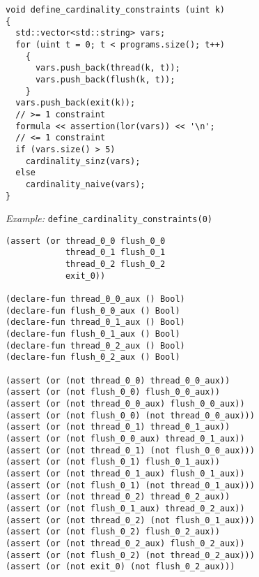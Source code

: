 \begin{lstlisting}[style=c++]
void define_cardinality_constraints (uint k)
{
  std::vector<std::string> vars;
  for (uint t = 0; t < programs.size(); t++)
    {
      vars.push_back(thread(k, t));
      vars.push_back(flush(k, t));
    }
  vars.push_back(exit(k));
  // >= 1 constraint
  formula << assertion(lor(vars)) << '\n';
  // <= 1 constraint
  if (vars.size() > 5)
    cardinality_sinz(vars);
  else
    cardinality_naive(vars);
}
\end{lstlisting}

\newpage

\noindent
\emph{Example:} \lstinline[style=c++]{define_cardinality_constraints(0)}

\begin{lstlisting}[language=SMTLib]
(assert (or thread_0_0 flush_0_0
            thread_0_1 flush_0_1
            thread_0_2 flush_0_2
            exit_0))

(declare-fun thread_0_0_aux () Bool)
(declare-fun flush_0_0_aux () Bool)
(declare-fun thread_0_1_aux () Bool)
(declare-fun flush_0_1_aux () Bool)
(declare-fun thread_0_2_aux () Bool)
(declare-fun flush_0_2_aux () Bool)

(assert (or (not thread_0_0) thread_0_0_aux))
(assert (or (not flush_0_0) flush_0_0_aux))
(assert (or (not thread_0_0_aux) flush_0_0_aux))
(assert (or (not flush_0_0) (not thread_0_0_aux)))
(assert (or (not thread_0_1) thread_0_1_aux))
(assert (or (not flush_0_0_aux) thread_0_1_aux))
(assert (or (not thread_0_1) (not flush_0_0_aux)))
(assert (or (not flush_0_1) flush_0_1_aux))
(assert (or (not thread_0_1_aux) flush_0_1_aux))
(assert (or (not flush_0_1) (not thread_0_1_aux)))
(assert (or (not thread_0_2) thread_0_2_aux))
(assert (or (not flush_0_1_aux) thread_0_2_aux))
(assert (or (not thread_0_2) (not flush_0_1_aux)))
(assert (or (not flush_0_2) flush_0_2_aux))
(assert (or (not thread_0_2_aux) flush_0_2_aux))
(assert (or (not flush_0_2) (not thread_0_2_aux)))
(assert (or (not exit_0) (not flush_0_2_aux)))
\end{lstlisting}


